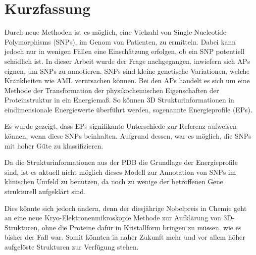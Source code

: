 \chapter{Kurzfassung}

Durch neue Methoden ist es möglich, eine Vielzahl von Single Nucleotide Polymorphisms (SNPs), im Genom von Patienten, zu ermitteln. Dabei kann jedoch nur in wenigen Fällen eine Einschätzung erfolgen, ob ein \ac{SNP} potentiell schädlich ist. In dieser Arbeit wurde der Frage nachgegangen, inwiefern sich \acf{APs} eignen, um \ac{SNP}s zu annotieren. \ac{SNP}s sind kleine genetische Variationen, welche Krankheiten wie \acf{AML} verursachen können. Bei den \ac{APs} handelt es sich um eine Methode der Transformation der physikochemischen Eigenschaften der Proteinstruktur in ein Energiemaß. So können 3D Strukturinformationen in eindimensionale Energiewerte überführt werden, sogenannte Energieprofile (EPs).



Es wurde gezeigt, dass EPs signifikante Unterschiede zur Referenz aufweisen können, wenn diese \ac{SNP}s beinhalten. Aufgrund dessen, war es möglich, die \ac{SNP}s mit hoher Güte zu klassifizieren. %

Da die Strukturinformationen aus der \ac{PDB} die Grundlage der Energieprofile sind, ist es aktuell nicht möglich dieses Modell zur Annotation von \ac{SNP}s im klinischen Umfeld zu benutzen, da noch zu wenige der betroffenen Gene strukturell aufgeklärt sind.

Dies könnte sich jedoch ändern, denn der diesjährige Nobelpreis in Chemie geht an eine neue Kryo-Elektronenmikroskopie Methode zur Aufklärung von 3D-Strukturen, ohne die Proteine dafür in Kristallform bringen zu müssen, wie es bisher der Fall war. Somit könnten in naher Zukunft mehr und vor allem höher aufgelöste Strukturen zur Verfügung stehen. 

